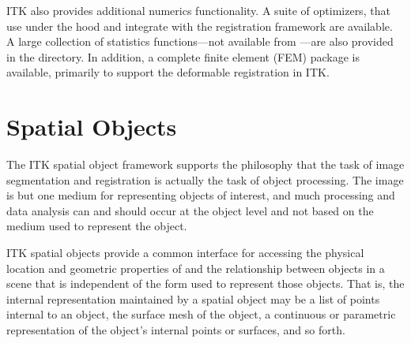 ITK also provides additional numerics functionality. A suite of optimizers, that
use  under the hood and integrate with the registration framework
are available. A large collection of statistics functions---not available from
---are also provided in the 
directory. In addition, a complete finite element (FEM) package is available,
primarily to support the deformable registration in ITK.

%
%
%
%
%
%
\section{Spatial Objects}
\label{sec:SpatialObjects}
%
The ITK spatial object framework supports the philosophy that the task of
image segmentation and registration is actually the task of object
processing. The image is but one medium for representing objects of interest,
and much processing and data analysis can and should occur at the object
level and not based on the medium used to represent the object.

ITK spatial objects provide a common interface for accessing the physical
location and geometric properties of and the relationship between objects in
a scene that is independent of the form used to represent those objects. That
is, the internal representation maintained by a spatial object may be a list
of points internal to an object, the surface mesh of the object, a continuous
or parametric representation of the object's internal points or surfaces, and
so forth.

